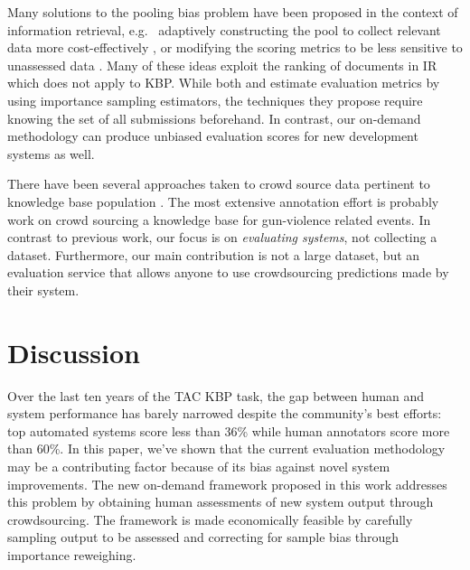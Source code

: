 Many solutions to the pooling bias problem have been proposed in the context of information retrieval, e.g.\ 
  adaptively constructing the pool to collect relevant data more cost-effectively \citep{zobel1998reliable,cormack1998efficient,aslam2006statistical}, or
  modifying the scoring metrics to be less sensitive to unassessed data \citep{buckley2004incomplete,sakai2008information,aslam2006statistical}.
Many of these ideas exploit the ranking of documents in IR which does not apply to KBP.\@
While both \citet{aslam2006statistical} and \citet{yilmaz2008simple} estimate evaluation metrics by using importance sampling estimators, the techniques they propose require knowing the set of all submissions beforehand.
In contrast, our on-demand methodology can produce unbiased evaluation scores for new development systems as well.

There have been several approaches taken to crowd source data pertinent to knowledge base population \citep{vannella2014validating,angeli2014combining,he2015question,liu2016effective}.
The most extensive annotation effort is probably \citet{pavlick2016gun} work on crowd sourcing a knowledge base for gun-violence related events.
In contrast to previous work, our focus is on \textit{evaluating systems}, not collecting a dataset.
Furthermore, our main contribution is not a large dataset, but an evaluation service that allows anyone to use crowdsourcing predictions made by their system. 

\section{Discussion}
\label{sec:discussion}

Over the last ten years of the TAC KBP task, the gap between human and system performance has barely narrowed despite the community's best efforts: top automated systems score less than 36\% \fone{} while human annotators score more than 60\%.
In this paper, we've shown that the current evaluation methodology may be a contributing factor because of its bias against novel system improvements.
The new on-demand framework proposed in this work addresses this problem by obtaining human assessments of new system output through crowdsourcing.
The framework is made economically feasible by carefully sampling output to be assessed and correcting for sample bias through importance reweighing.

